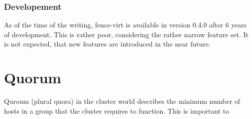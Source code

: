 \subsubsection{Developement}
As of the time of the writing, fence-virt is available in version 0.4.0 after
6 years of development. This is rather poor, considering the rather narrow feature
set. It is not expected, that new features are introduced in the near future.
\section{Quorum}
Quroum (plural quora) in the cluster world describes the minimum number
of hosts in a group that the cluster requires to function. This is important to 
